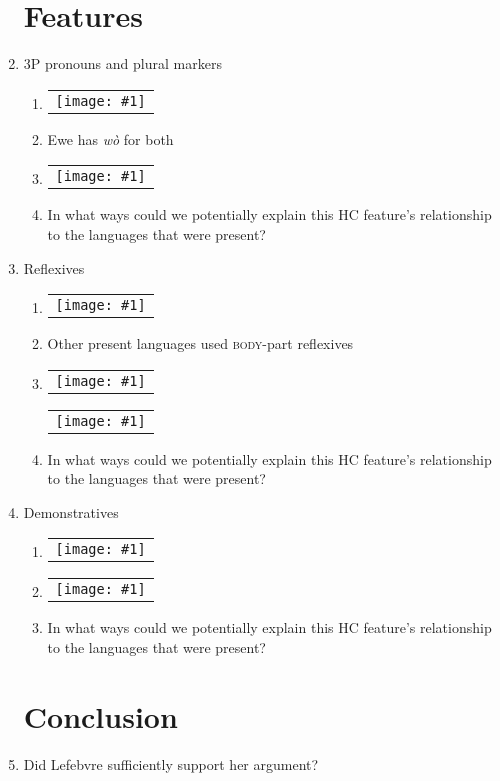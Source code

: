 \documentclass{article}
\newcommand{\lexi}[1]{\textit{#1}}
\newcommand{\image}[1]{
    \begin{tabular}[t]{c}
      \\
      \texttt{[image: \#1]}
    \end{tabular}
  }
\begin{document}
\begin{enumerate}
    \section{Features}
      \item 3P pronouns and plural markers
      \begin{enumerate}
        \item \image{plural_fongbe.jpg}
        \item Ewe has \lexi{wò} for both
        \item \image{plural_haitian.jpg}
        \item In what ways could we potentially explain this HC feature's relationship to the languages that were present?
      \end{enumerate}
      \item Reflexives
      \begin{enumerate}
        \item \image{reflex_fongbe.jpg}
        \item Other present languages used \textsc{body}-part reflexives
        \item \image{reflex_haitian.jpg}
          \image{reflex_haitian_more.jpg}
        \item In what ways could we potentially explain this HC feature's relationship to the languages that were present?
      \end{enumerate}
  \newpage
      \item Demonstratives
      \begin{enumerate}
        \item \image{demonstratives.jpg}
        \item \image{demo_features.jpg} %
        \item In what ways could we potentially explain this HC feature's relationship to the languages that were present?
      \end{enumerate}
    \section{Conclusion}
      \item Did Lefebvre sufficiently support her argument?
  \end{enumerate}
\end{document}
